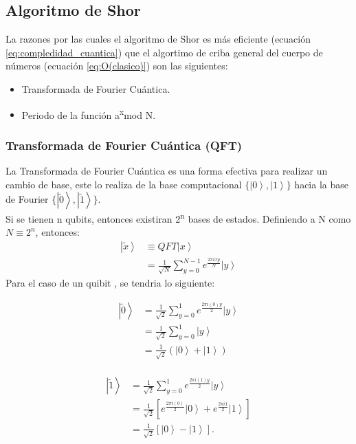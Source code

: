 \subsection{Algoritmo de Shor}
La razones por las cuales el algoritmo de Shor es más eficiente (ecuación \ref{eq:compledidad_cuantica}) que el algortimo de criba general del cuerpo de números (ecuación \ref{eq:O(clasico)}) son las siguientes:
\begin{itemize}
    \item Transformada de Fourier Cuántica.
    \item Periodo de la función a\textsuperscript{x}mod N.
\end{itemize}
\subsubsection{Transformada de Fourier Cuántica (QFT)}
La Transformada de Fourier Cuántica es una forma efectiva para realizar un cambio de base, este lo realiza de la base computacional $\lbrace \left|0 \right\rangle,\left|1 \right\rangle \rbrace$ hacia 
la base de Fourier $\lbrace \left| \tilde{0} \right\rangle,\left| \tilde{1} \right\rangle \rbrace$.\\
Si se tienen n qubits, entonces existiran 2\textsuperscript{n} bases de estados. Definiendo a N como $N\equiv 2^n$, entonces:
\begin{align*}
    \left|\tilde{x} \right\rangle &\equiv QFT\left| x \right\rangle\\
    &= \frac{1}{\sqrt{N}} \sum\limits_{y=0}^{N-1} e^{\frac{2\pi i x y}{N}} \left|y \right\rangle
\end{align*}
Para el caso de un quibit \cite{Zhou2017,Lomonaco2005} , se tendria lo siguiente:\\
\begin{minipage}{0.5\linewidth}
    \begin{align*}
        \left|\tilde{0} \right\rangle &= \frac{1}{\sqrt{2}} \sum\limits_{y=0}^1 e^{\frac{2\pi i (0)y}{2}} \left|y \right\rangle \\
        &= \frac{1}{\sqrt{2}} \sum\limits_{y=0}^1 \left|y \right\rangle \\
        &= \frac{1}{\sqrt{2}} \left(\left| 0\right\rangle + \left| 1\right\rangle \right) \\
    \end{align*}  
\end{minipage}
\begin{minipage}{0.5\linewidth}
    \begin{align*}
        \left| \tilde{1} \right\rangle & = \frac{1}{\sqrt{2}} \sum\limits_{y=0}^1 e^{\frac{2\pi i (1)y}{2}} \left|y \right\rangle \\
        &= \frac{1}{\sqrt{2}} \left[e^{\frac{2\pi i(0)}{2}}\left| 0\right\rangle+ e^{\frac{2  \pi i 1}{2}} \left|1 \right\rangle\right] \\
        &= \frac{1}{\sqrt{2}} \left[\left|0 \right\rangle-\left|1 \right\rangle \right].\\
    \end{align*}
\end{minipage}
